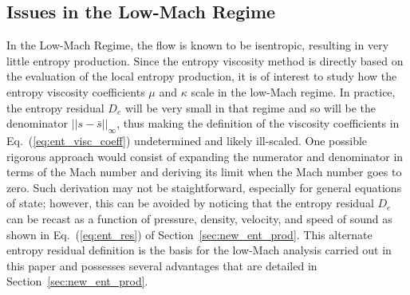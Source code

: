 \documentclass[preprint,10pt]{elsarticle}
\newcommand{\eqt}[1]{Eq.~(\ref{#1})}                     %
\newcommand{\sct}[1]{Section~\ref{#1}}                   %
\begin{document}
\subsection{Issues in the Low-Mach Regime} 

In the Low-Mach Regime, the flow is known to be isentropic, resulting in very little entropy production. Since the entropy viscosity method is directly based on the evaluation of the local entropy production, it is of interest to study how the entropy viscosity coefficients $\mu$ and $\kappa$ scale in the low-Mach regime. In practice, the entropy residual $D_e$ will be very small in that regime and so will be the denominator $|| s - \bar{s} ||_\infty$, thus making the definition of the viscosity coefficients in \eqt{eq:ent_visc_coeff} undetermined and likely ill-scaled.  One possible rigorous approach would consist of expanding the numerator and denominator in terms of the Mach number and deriving its limit when the Mach number goes to zero. Such derivation may not be staightforward, especially for general equations of state; however, this can be avoided by noticing that the entropy residual $D_e$ can be recast as a function of pressure, density, velocity, and speed of sound as shown in \eqt{eq:ent_res} of \sct{sec:new_ent_prod}. This alternate entropy residual definition is the basis for the low-Mach analysis carried out in this paper and possesses several advantages that are detailed in \sct{sec:new_ent_prod}.

\end{document}
